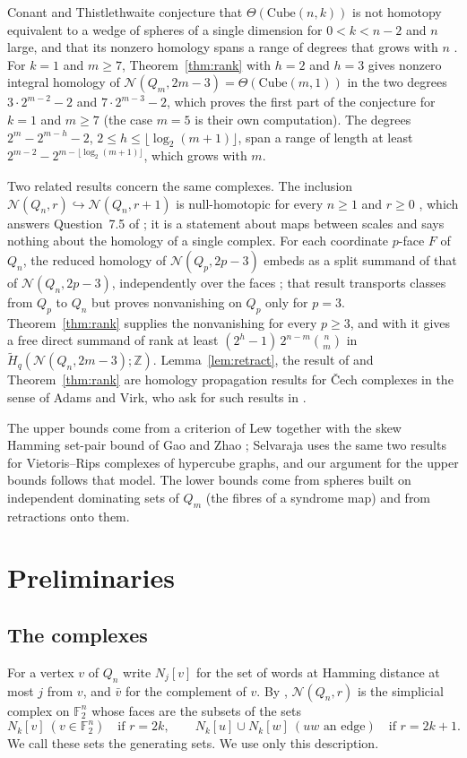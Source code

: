 \documentclass[11pt]{amsart}
\theoremstyle{definition}
\theoremstyle{remark}
\newcommand{\N}{\mathcal{N}}
\newcommand{\Q}{Q}
\newcommand{\F}{\mathbb{F}}
\newcommand{\Z}{\mathbb{Z}}
\newcommand{\Hred}{\widetilde{H}}
\newcommand{\cl}[2]{N_{#1}[#2]}
\begin{document}
Conant and Thistlethwaite conjecture that $\Theta(\mathrm{Cube}(n,k))$ is not homotopy equivalent to a wedge of spheres
of a single dimension for $0<k<n-2$ and $n$ large, and that its nonzero homology spans a range of degrees that grows with $n$
\cite[Conjecture~2]{CT}. For $k=1$ and $m\ge7$, Theorem~\ref{thm:rank} with $h=2$ and $h=3$ gives nonzero integral
homology of $\N(\Q_m,2m-3)=\Theta(\mathrm{Cube}(m,1))$ in the two degrees $3\cdot2^{m-2}-2$ and $7\cdot2^{m-3}-2$, which
proves the first part of the conjecture for $k=1$ and $m\ge7$ (the case $m=5$ is their own computation). The degrees
$2^m-2^{m-h}-2$, $2\le h\le\lfloor\log_2(m+1)\rfloor$, span a range of length at least $2^{m-2}-2^{m-\lfloor\log_2(m+1)\rfloor}$,
which grows with $m$.

Two related results concern the same complexes. The inclusion $\N(\Q_n,r)\hookrightarrow\N(\Q_n,r+1)$ is
null-homotopic for every $n\ge1$ and $r\ge0$ \cite{Sh1}, which answers Question~7.5 of \cite{ASS}; it is a statement about maps between scales and
says nothing about the homology of a single complex. For each coordinate $p$-face $F$ of $\Q_n$, the reduced homology of
$\N(\Q_p,2p-3)$ embeds as a split summand of that of $\N(\Q_n,2p-3)$, independently over the faces \cite{FC}; that
result transports classes from $\Q_p$ to $\Q_n$ but proves nonvanishing on $\Q_p$ only for $p=3$. Theorem~\ref{thm:rank}
supplies the nonvanishing for every $p\ge3$, and with \cite{FC} it gives a free direct summand of rank at least
$(2^h-1)\,2^{n-m}\binom{n}{m}$ in $\Hred_q(\N(\Q_n,2m-3);\Z)$. Lemma~\ref{lem:retract}, the result of \cite{FC} and
Theorem~\ref{thm:rank} are homology propagation
results for \v{C}ech complexes in the sense of Adams and Virk, who ask for such results in \cite[Question~8.8]{AV}.

The upper bounds come from a criterion of Lew \cite{Lew} together with the skew Hamming set-pair bound of Gao and Zhao
\cite{GZ}; Selvaraja \cite[Section~5]{Sel} uses the same two results for Vietoris--Rips complexes of hypercube graphs,
and our argument for the upper bounds follows that model. The lower bounds come from spheres built on independent
dominating sets of $\Q_m$ (the fibres of a syndrome map) and from retractions onto them.

\section{Preliminaries}

\subsection{The complexes}
For a vertex $v$ of $\Q_n$ write $\cl{j}{v}$ for the set of words at Hamming distance at most $j$ from $v$, and
$\bar v$ for the complement of $v$. By \cite[Lemma~2.2]{ASS}, $\N(\Q_n,r)$ is the simplicial complex on $\F_2^n$ whose
faces are the subsets of the sets
\[
\cl{k}{v}\ (v\in\F_2^n)\quad\text{if } r=2k,\qquad
\cl{k}{u}\cup\cl{k}{w}\ (uw\text{ an edge})\quad\text{if } r=2k+1 .
\]
We call these sets the generating sets. We use only this description.
\end{document}
